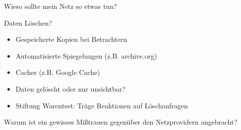 \begin{frame}{Wieso sollte mein Netz so etwas tun?}
\end{frame}

\begin{frame}{Daten Löschen?}
	\begin{itemize}
		\item Gespeicherte Kopien bei Betrachtern
		\item Automatisierte Spiegelungen (z.B. archive.org)
		\item Caches (z.B. Google Cache)
		\item Daten gelöscht oder nur unsichtbar?
		\item Stiftung Warentest: Träge Reaktionen auf Löschanfragen
	\end{itemize}
\end{frame}

\begin{frame}{Warum ist ein gewisses Mißtrauen gegenüber den Netzprovidern angebracht?}
\end{frame}

